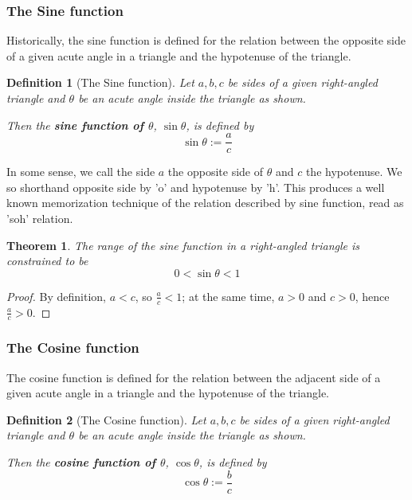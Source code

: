 \documentclass[12pt]{article}
\newtheorem{definition}{Definition}[section]
\newtheorem*{theorem}{Theorem}
\begin{document}
    \subsubsection*{The Sine function}

    Historically, the sine function is defined for the relation between the opposite side of a given acute angle in a triangle and the hypotenuse of the triangle.

    \begin{definition}[The Sine function]
        Let $a,b,c$ be sides of a given right-angled triangle and $\theta$ be an acute angle inside the triangle as shown.

        Then the \textbf{sine function of $\theta$}, $\sin{\theta}$, is defined by $$\sin{\theta}:=\frac{a}{c}$$
    \end{definition}

    In some sense, we call the side $a$ the opposite side of $\theta$ and $c$ the hypotenuse. We so shorthand opposite side by 'o' and hypotenuse by 'h'. This produces a well known memorization technique of the relation described by sine function, read as 'soh' relation.

    \begin{theorem}
        The range of the sine function in a right-angled triangle is constrained to be $$0<\sin{\theta}<1$$
    \end{theorem}

    \begin{proof}
        By definition, $a<c$, so $\frac{a}{c}<1$; at the same time, $a>0$ and $c>0$, hence $\frac{a}{c}>0$.
    \end{proof}

    \subsubsection*{The Cosine function}

    The cosine function is defined for the relation between the adjacent side of a given acute angle in a triangle and the hypotenuse of the triangle.

    \begin{definition}[The Cosine function]
        Let $a,b,c$ be sides of a given right-angled triangle and $\theta$ be an acute angle inside the triangle as shown.

        Then the \textbf{cosine function of $\theta$}, $\cos{\theta}$, is defined by $$\cos{\theta}:=\frac{b}{c}$$
    \end{definition}
\end{document}
